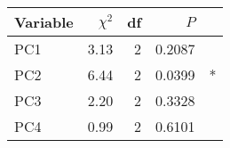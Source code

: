 
\begin{tabular}{lrrrl}
\toprule
Variable & $\chi^2$ & df & $P$ & \\
\midrule
PC1 & 3.13 & 2 & 0.2087 & \\
PC2 & 6.44 & 2 & 0.0399 & *\\
PC3 & 2.20 & 2 & 0.3328 & \\
PC4 & 0.99 & 2 & 0.6101 & \\
\bottomrule
\end{tabular}

